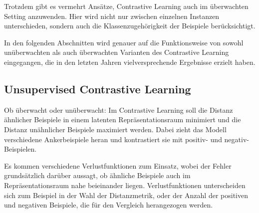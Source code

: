 Trotzdem gibt es vermehrt Ansätze, Contrastive Learning auch im überwachten Setting anzuwenden. Hier wird nicht nur zwischen einzelnen Instanzen unterschieden, sondern auch die Klassenzugehörigkeit der Beispiele berücksichtigt.

In den folgenden Abschnitten wird genauer auf die Funktionsweise von sowohl unüberwachten als auch überwachten Varianten des Contrastive Learning eingegangen, die in den letzten Jahren vielversprechende Ergebnisse erzielt haben.

\subsection{Unsupervised Contrastive Learning} \label{sec:unsup-contrastive}

Ob überwacht oder unüberwacht: Im Contrastive Learning soll die Distanz ähnlicher Beispiele in einem latenten Repräsentationsraum minimiert und die Distanz unähnlicher Beispiele maximiert werden. Dabei zieht das Modell verschiedene Ankerbeispiele heran und kontrastiert sie mit positiv- und negativ-Beispielen.

Es kommen verschiedene Verlustfunktionen zum Einsatz, wobei der Fehler grundsätzlich darüber aussagt, ob ähnliche Beispiele auch im Repräsentationsraum nahe beieinander liegen. Verlustfunktionen unterscheiden sich zum Beispiel in der Wahl der Distanzmetrik, oder der Anzahl der positiven und negativen Beispiele, die für den Vergleich herangezogen werden.

